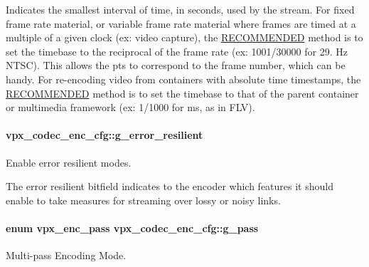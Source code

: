 \-Indicates the smallest interval of time, in seconds, used by the stream. \-For fixed frame rate material, or variable frame rate material where frames are timed at a multiple of a given clock (ex\-: video capture), the \hyperlink{rfc2119_RECOMMENDED}{\-R\-E\-C\-O\-M\-M\-E\-N\-D\-E\-D} method is to set the timebase to the reciprocal of the frame rate (ex\-: 1001/30000 for 29. \-Hz \-N\-T\-S\-C). \-This allows the pts to correspond to the frame number, which can be handy. \-For re-\/encoding video from containers with absolute time timestamps, the \hyperlink{rfc2119_RECOMMENDED}{\-R\-E\-C\-O\-M\-M\-E\-N\-D\-E\-D} method is to set the timebase to that of the parent container or multimedia framework (ex\-: 1/1000 for ms, as in \-F\-L\-V). \hypertarget{structvpx__codec__enc__cfg_a4e17173b66ca0d7dfba9978625d7ba76}{
\paragraph[{g\-\_\-error\-\_\-resilient}]{ {\bf vpx\-\_\-codec\-\_\-enc\-\_\-cfg\-::g\-\_\-error\-\_\-resilient}}}\label{structvpx__codec__enc__cfg_a4e17173b66ca0d7dfba9978625d7ba76}


\-Enable error resilient modes. 

\-The error resilient bitfield indicates to the encoder which features it should enable to take measures for streaming over lossy or noisy links. \hypertarget{structvpx__codec__enc__cfg_a70d62d87aae7d1168746577f14a6dccf}{
\paragraph[{g\-\_\-pass}]{\setlength{\rightskip}{0pt plus 5cm}enum {\bf vpx\-\_\-enc\-\_\-pass} {\bf vpx\-\_\-codec\-\_\-enc\-\_\-cfg\-::g\-\_\-pass}}}\label{structvpx__codec__enc__cfg_a70d62d87aae7d1168746577f14a6dccf}


\-Multi-\/pass \-Encoding \-Mode. 

